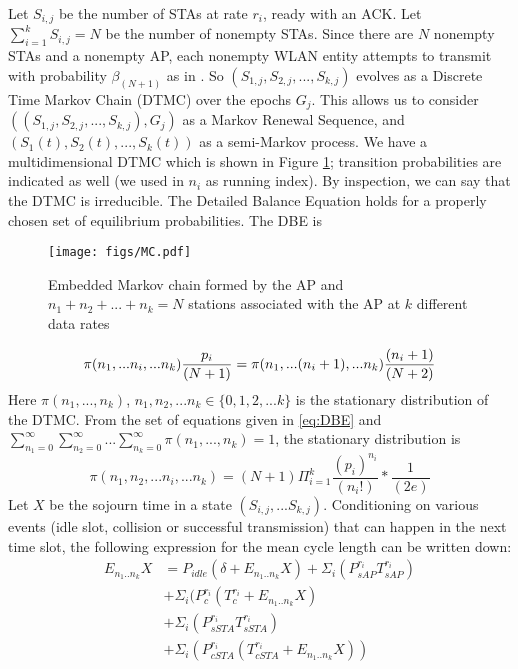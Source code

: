 \documentclass[conference]{IEEEtran}
\begin{document}
Let $ S_{i,j} $ be the number of STAs at rate $ r_i $, ready with an ACK. 
Let $ \sum_{i=1}^{k} S_{i,j} = N $ be the number of nonempty STAs. Since there
are $N$ nonempty STAs and a nonempty AP, each nonempty WLAN entity attempts to
transmit with probability $ \beta_{(N+1)} $ as in \cite{astn_model:kumar}. So 
$( S_{1,j}, S_{2,j},..., S_{k,j} )$ evolves as a Discrete Time Markov Chain
(DTMC) over the epochs $ G_j $. This allows us to consider
$((S_{1,j}, S_{2,j},..., S_{k,j} ) , G_j) $ as a Markov Renewal Sequence, and
$( S_{1}(t), S_{2}(t),..., S_{k}(t) )$ as a semi-Markov process.
We have a multidimensional DTMC which is shown in Figure \ref{fig:MarkovChain};
transition probabilities are indicated as well (we used in $n_i$ as running index). By inspection, we can say that 
the DTMC is irreducible. The Detailed Balance Equation holds for a properly
chosen set of equilibrium probabilities. The DBE is
\begin{figure}\centering
\texttt{[image: figs/MC.pdf]}
\caption{Embedded Markov chain formed by the AP and $ n_1 + n_2 + ... + n_k = N 
$ stations associated with the AP at $ k $ different data rates }
\label{fig:MarkovChain}
\end{figure}
\begin{equation}
\fontsize{8}{8} \selectfont
\pi(n_1,...n_i ,...n_k ) \frac{p_i}{(N+1)} 
= \pi(n_1,...(n_i +1),...n_k )\frac{(n_i+1)}{(N+2)} 
\label{eq:DBE}
\end{equation}
Here $ \pi(n_1,...,n_k ) $, $ n_1, n_2, ... n_k \in \lbrace 
0,1,2,...k \rbrace $ is the stationary distribution of the DTMC. From the set 
of equations given in \eqref{eq:DBE} and 
$ \sum _{n_1=0} ^{ \infty } \sum _{n_2=0} ^{ \infty }... \sum _{n_k=0} ^{ 
\infty } \pi(n_1,...,n_k )  = 1 $, the stationary distribution is
\begin{equation}
\pi(n_1,n_2,...n_i ,...n_k ) = (N+1) \Pi _{i=1} ^{k} \frac{(p_i)^{n_i} 
}{(n_i!)} * \frac{1}{(2e)}  
\label{eq:stationary_dist}
\end{equation}	
Let $ X $ be the sojourn time in a state $ ( S_{i,j}, ... S_{k,j} ) $. 
Conditioning on various events (idle slot, collision or successful 
transmission) that can happen in the next time slot, the
following expression for the mean cycle length can be written down: \\
\begin{equation}
\begin{split}
E_{n_1..n_k}X & = P_{idle}(\delta + E_{n_1..n_k}X)  + \Sigma_{i} ( P^{r_i} 
_{sAP}  T^{r_i} _{sAP} )\\
& + \Sigma_{i} ( P^{r_i} _{c} ( T^{r_i} _{c} + E_{n_1..n_k}X ) \\
& +\Sigma_{i} ( P^{r_i} _{sSTA}  T^{r_i} _{sSTA} ) \\
& +\Sigma_{i} \left( P^{r_i} _{cSTA} ( T^{r_i} _{cSTA} + E_{n_1..n_k}X) \right)  
\label{eq:enx11}
\end{split}
\end{equation}
\end{document}
